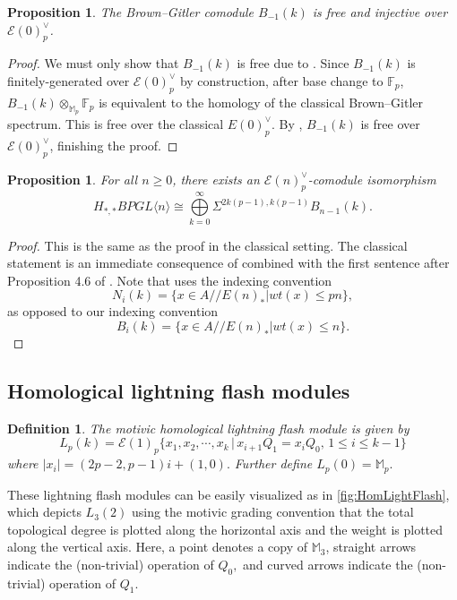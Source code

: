 \documentclass{amsart}
\newtheorem{proposition}[theorem]{Proposition}
\newtheorem{definition}[theorem]{Definition}
\theoremstyle{plain}
\numberwithin{theorem}{section}
\numberwithin{equation}{section}
\numberwithin{figure}{section}
\newcommand{\mM}{{\mathbb M}}
\newcommand{\cE}{{\mathcal E}}
\newcommand{\0}{\langle 0 \rangle }
\begin{document}
\begin{proposition} \label{prop:BGfreeinjective}
    The Brown--Gitler comodule $B_{-1}(k)$ is free and injective over $\cE(0)_p^\vee$.
\end{proposition}

\begin{proof}
    We must only show that $B_{-1}(k)$ is free due to . Since $B_{-1}(k)$ is finitely-generated over $\mathcal{E}(0)^\vee_p$ by construction, after base change to $\mathbb{F}_p$, $B_{-1}(k) \otimes_{\mathbb{M}_p}\mathbb{F}_p$ is equivalent to the homology of the classical Brown--Gitler spectrum. This is free over the classical $E(0)_p^\vee$. By , $B_{-1}(k)$ is free over $\mathcal{E}(0)^\vee_p$, finishing the proof. 
\end{proof}



\begin{proposition}\label{prop:BGdecomposition} 
    For all $n \ge 0$, there exists an $\mathcal{E}(n)_p^\vee$-comodule isomorphism 
    \[
    H_{*,*}BPGL\langle n \rangle \cong \bigoplus\limits_{k=0}^{\infty} \Sigma^{2k(p-1),k(p-1)} B_{n-1}(k).
    \]
\end{proposition}
\begin{proof}
    This is the same as the proof in the classical setting. The classical statement is an immediate consequence of \cite[Cor~4.10]{CulverOddp20} combined with the first sentence after Proposition 4.6 of \cite{CulverOddp20}. Note that \cite{CulverOddp20} uses the indexing convention 
    \[
    N_{i}(k) = \{ x \in A//E(n)_{*}| wt(x) \le pn \},
    \]
    as opposed to our indexing convention 
    \[
    B_{i}(k) = \{ x \in A//E(n)_{*}| wt(x) \le n \}.
    \]
\end{proof}


\subsection{Homological lightning flash modules}

\begin{definition}\label{def: lightning}
    The motivic homological lightning flash module is given by 
    $$L_p(k) = \mathcal{E}(1)_p \{x_1, x_2, \cdots, x_k \, |\,  x_{i + 1} Q_1 =  x_i Q_0,\, 1 \leq i \leq k-1 \}$$
    where $| x_i| = (2p-2, p-1)i+(1,0).$ Further define $L_p(0) = \mM_p.$
\end{definition}


These lightning flash modules can be easily visualized as in \cref{fig:HomLightFlash}, which depicts $L_3(2)$ using the motivic grading convention that the total topological degree is plotted along the horizontal axis and the weight is plotted along the vertical axis.  Here, a point denotes a copy of $\mM_3$, straight arrows indicate the
(non-trivial) operation of $Q_0,$ and curved arrows indicate the (non-trivial) operation of $Q_1.$  
\end{document}
